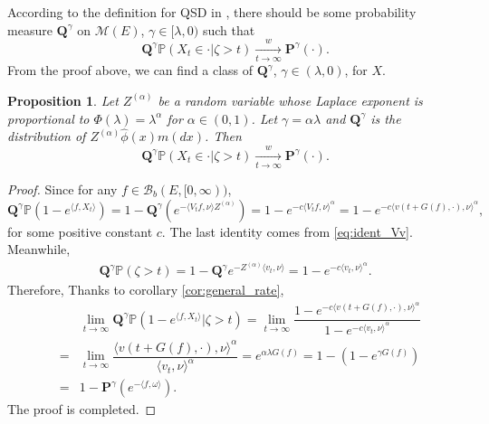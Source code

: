\documentclass[12pt,a4paper]{amsart}
\numberwithin{equation}{section}
\theoremstyle{plain}
\newtheorem{prop}[thm]{Proposition}
\theoremstyle{definition}
\begin{document}
{%
{\color{blue}According to the definition for QSD in \cite{ChampagnatVillemonais2018Convergence}, there should be some probability measure $\mathbf Q^\gamma$ on $\mathcal M(E)$, $\gamma\in[\lambda, 0)$ such that
  \[
    \mathbf Q^{\gamma}\mathbb P(X_t \in \cdot | \zeta > t) \xrightarrow[t\to \infty]{w} {\mathbf P^\gamma}(\cdot).
  \]
  From the proof above, we can find a class of $\mathbf Q^\gamma$, $\gamma\in (\lambda, 0)$, for $X$.
  \begin{prop}
    Let $Z^{(\alpha)}$ be a random variable whose Laplace exponent is proportional to $\Phi(\lambda)=\lambda^{\alpha}$ for $\alpha\in(0,1)$.  Let $\gamma=\alpha\lambda$ and $\mathbf Q^{\gamma}$ is the distribution of $Z^{(\alpha)}\widehat\phi(x)m(dx)$.  Then
    \[
      \mathbf Q^{\gamma}\mathbb P(X_t \in \cdot | \zeta > t) \xrightarrow[t\to \infty]{w} {\mathbf P^\gamma}(\cdot).
    \]
  \end{prop}
  \begin{proof}
    Since for any $f\in\mathcal B_b(E,[0,\infty))$,
    \[
      \mathbf Q^{\gamma}\mathbb P\left(1-e^{\langle f, X_t\rangle }\right)=1-\mathbf Q^{\gamma}\left(e^{-\langle V_tf,\nu\rangle Z^{(\alpha)}}\right)
      =1-e^{-c\langle V_tf,\nu\rangle^\alpha}=1-e^{-c\langle v(t+G(f),\cdot),\nu\rangle^\alpha},
    \]
    for some positive constant $c$. The last identity comes from \eqref{eq:ident_Vv}.  Meanwhile,
    \begin{eqnarray*}
      \mathbf Q^{\gamma}\mathbb P(\zeta>t)=1-\mathbf Q^{\gamma}e^{-Z^{(\alpha)}\langle v_t,\nu\rangle }=1-e^{-c\langle v_t,\nu\rangle^\alpha}.
    \end{eqnarray*}
    Therefore, Thanks to corollary \ref{cor:general_rate},
    \begin{eqnarray*}
      &&\lim_{t\to\infty}\mathbf Q^{\gamma}\mathbb P\left(1-e^{\langle f, X_t\rangle }\big|\zeta>t\right)=\lim_{t\to\infty}\dfrac{1-e^{-c\langle v(t+G(f),\cdot),\nu\rangle^\alpha}}{1-e^{-c\langle v_t,\nu\rangle^\alpha}}\\
      &=&\lim_{t\to\infty}\dfrac{\langle v(t+G(f),\cdot),\nu\rangle^\alpha}{\langle v_t,\nu\rangle^\alpha}= e^{\alpha\lambda G(f)}=1-(1-e^{\gamma G(f)})\\
      &=&1-\mathbf P^{\gamma}(e^{-\langle f,\omega\rangle}).
    \end{eqnarray*}
    The proof is completed.
  \end{proof}
}


}
\end{document}
